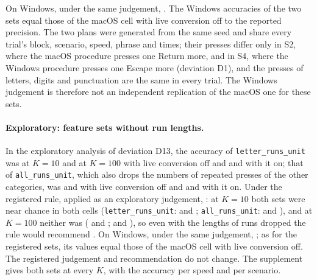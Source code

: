 On Windows, under the same judgement, . The Windows accuracies of the two sets equal those
of the macOS cell with live conversion off to the reported precision. The two plans were generated from the same seed
and share every trial's block, scenario, speed, phrase and times; their presses differ only in S2, where the macOS
procedure presses one Return more, and in S4, where the Windows procedure presses one Escape more (deviation D1), and
the presses of letters, digits and punctuation are the same in every trial. The Windows judgement is therefore not an
independent replication of the macOS one for these sets.

\paragraph{Exploratory: feature sets without run lengths.} In the exploratory analysis of deviation D13, the accuracy of
\texttt{letter\_runs\_unit} was  at $K = 10$ and
 at $K = 100$ with live conversion off and
 and 
with it on; that of \texttt{all\_runs\_unit}, which also drops the numbers of repeated presses of the other categories,
was  and 
with live conversion off and  and
 with it on. Under the registered rule, applied as an exploratory
judgement, : at $K = 10$ both sets were near chance in both cells
(\texttt{letter\_runs\_unit}:  and
; \texttt{all\_runs\_unit}:
 and ),
and at $K = 100$ neither was ( and
;  and
), so even with the lengths of runs dropped the rule would
recommend . On Windows, under the same judgement,
; as for the registered sets, its values equal those of the macOS cell with live conversion off. The
registered judgement and recommendation do not change. The supplement gives both sets at every $K$, with the accuracy
per speed and per scenario.

